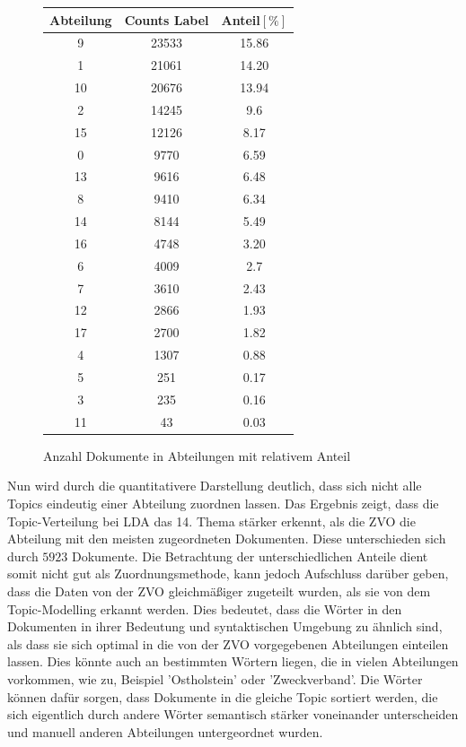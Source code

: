 \documentclass[german,version-2020-11]{uzl-thesis}
\begin{document}
\begin{enumerate}

\begin{figure}[H]
\begin{center}
\begin{tabular}{ccc}
\hline
\hline
Abteilung & Counts Label & Anteil$[\%]$\\
\hline
9&23533&15.86\\
1&21061&14.20\\
10&20676&13.94\\
2&14245&9.6\\
15&12126&8.17\\
0&9770&6.59\\
13&9616&6.48\\
8&9410&6.34\\
14&8144&5.49\\
16&4748&3.20\\
6&4009&2.7\\
7&3610&2.43\\
12&2866&1.93\\
17&2700&1.82\\
4&1307&0.88\\
5&251& 0.17\\
3&235&0.16\\
11&43&0.03\\
\hline
\hline
\end{tabular}
\caption{Anzahl Dokumente in Abteilungen mit relativem Anteil}
\end{center}
\end{figure}


Nun wird durch die quantitativere Darstellung deutlich, dass sich nicht alle Topics eindeutig einer Abteilung zuordnen lassen. Das Ergebnis zeigt, dass die Topic-Verteilung bei LDA das 14. Thema stärker erkennt, als die ZVO die Abteilung mit den meisten zugeordneten Dokumenten. Diese unterschieden sich durch $5923$ Dokumente. Die Betrachtung der unterschiedlichen Anteile dient somit nicht gut als Zuordnungsmethode, kann jedoch Aufschluss darüber geben, dass die Daten von der ZVO gleichmäßiger zugeteilt wurden, als sie von dem Topic-Modelling erkannt werden. Dies bedeutet, dass die Wörter in den Dokumenten in ihrer Bedeutung und syntaktischen Umgebung zu ähnlich sind, als dass sie sich optimal in die von der ZVO vorgegebenen Abteilungen einteilen lassen. Dies könnte auch an bestimmten Wörtern liegen, die in vielen Abteilungen vorkommen, wie zu, Beispiel 'Ostholstein' oder 'Zweckverband'. Die Wörter können dafür sorgen, dass Dokumente in die gleiche Topic sortiert werden, die sich eigentlich durch andere Wörter semantisch stärker voneinander unterscheiden und manuell anderen Abteilungen untergeordnet wurden.\\ 




\end{enumerate}
\end{document}
